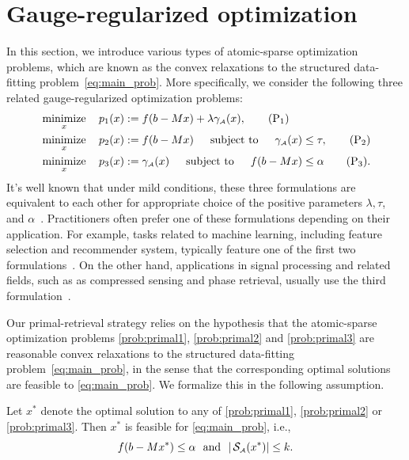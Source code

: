 \section{Gauge-regularized optimization}
\label{sec:4-2}

In this section, we introduce various types of atomic-sparse optimization problems, which are known as the convex relaxations to the structured data-fitting problem~\eqref{eq:main_prob}. More specifically, 
we consider the following three related gauge-regularized optimization
problems:
\begin{align} 
  & \displaystyle\mathop{\hbox{\rm minimize}}_{x}\enspace\enspace p_1(x) := f(b - Mx) + \lambda\gamma_{\scriptscriptstyle\mathcal{A}}(x), \label{prob:primal1} \tag{P$_1$} \\
  & \displaystyle\mathop{\hbox{\rm minimize}}_{x}\enspace\enspace p_2(x) := f(b - Mx) \enspace\hbox{\quad subject to\quad}\enspace \gamma_{\scriptscriptstyle\mathcal{A}}(x) \leq \tau, \label{prob:primal2} \tag{P$_2$} \\
  & \displaystyle\mathop{\hbox{\rm minimize}}_{x}\enspace\enspace p_3(x) := \gamma_{\scriptscriptstyle\mathcal{A}}(x)  \enspace\hbox{\quad subject to\quad}\enspace f(b - Mx) \leq \alpha \label{prob:primal3} \tag{P$_3$}. 
\end{align}
It's well known that under mild conditions, these three formulations are equivalent to each other for appropriate choice of the positive parameters $\lambda, \tau$, and $\alpha$~\cite{FrieTsen:2006}. Practitioners often prefer one of these formulations depending on their application. For example, tasks related to machine learning, including feature selection and recommender system, typically feature one of the first two formulations~\cite{tibshirani1996regression,yul06,Meinshausen06}.  On the other hand, applications in signal processing and related fields, such as as compressed sensing and phase retrieval, usually use the third formulation~\cite{berg2008probing,candes:2013}. 

Our primal-retrieval strategy relies on the hypothesis that the atomic-sparse optimization problems \eqref{prob:primal1}, \eqref{prob:primal2} and \eqref{prob:primal3} are reasonable convex relaxations to the structured data-fitting problem~\eqref{eq:main_prob}, in the sense that the corresponding optimal solutions are feasible to \eqref{eq:main_prob}. We formalize this in the following assumption.

\begin{assumption} \label{ass:blanket}
    Let $x^*$ denote the optimal solution to any of \eqref{prob:primal1}, \eqref{prob:primal2} or \eqref{prob:primal3}. Then $x^*$ is feasible for \eqref{eq:main_prob}, i.e., 
    \[f(b - Mx^*) \leq \alpha \enspace\mathop{\hbox{\rm and}}\enspace |\operatorname{\mathcal{S}_{\scriptscriptstyle\mathcal{A}}}(x^*)| \leq k.\]
\end{assumption}

